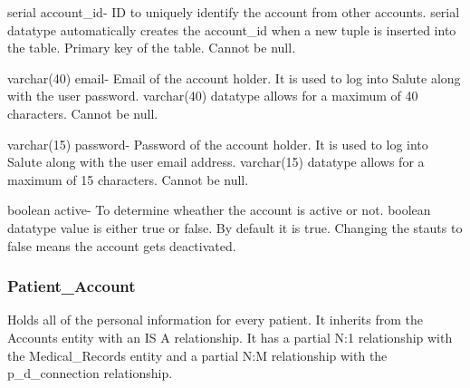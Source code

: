 \documentclass[12pt]{report}
\begin{document}
\begin{description}
\item serial account\_id- ID to uniquely identify the account from other accounts. serial datatype automatically creates the account\_id when a new tuple is inserted into the table.  Primary key of the table.  Cannot be null.
\item varchar(40) email- Email of the account holder. It is used to log into Salute along with the user password.  varchar(40) datatype allows for a maximum of 40 characters.  Cannot be null.
\item varchar(15) password-  Password of the account holder.  It is used to log into Salute along with the user email address.  varchar(15) datatype allows for a maximum of 15 characters.  Cannot be null.
\item boolean active- To determine wheather the account is active or not.  boolean datatype value is either true or false.  By default it is true.  Changing the stauts to false means the account gets deactivated.
\end{description}

\subsubsection{Patient\_Account}
Holds all of the personal information for every patient.  It inherits from the Accounts entity with an IS A relationship.  It has a partial N:1 relationship with the Medical\_Records entity and a partial N:M relationship with the p\_d\_connection relationship.
\end{document}
